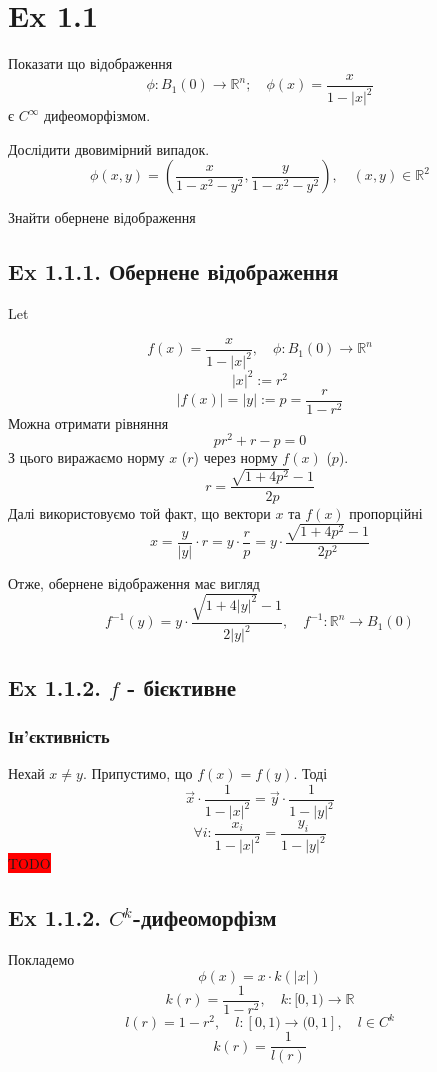 \documentclass[10pt, a4paper]{article} %
\newcommand{\R}{\mathbb{R}}
\newcommand{\todo}[1]{\colorbox{red}{#1}}
\begin{document}
\section*{Ex 1.1}
\begin{mdframed}
    Показати що відображення 
    \[\phi: B_1(0) \to \R^n; \quad \phi(x)=\frac{x}{1-|x|^2}\]
    є $C^\infty$ дифеоморфізмом.

    Дослідити двовимірний випадок.
    \[\phi(x,y) = \left(\frac{x}{1-x^2-y^2}, \frac{y}{1-x^2-y^2}\right), \quad (x,y)\in\R^2\]

    Знайти обернене відображення
\end{mdframed}

\subsection*{Ex 1.1.1. Обернене відображення}

Let 

\[f(x) = \frac{x}{1-|x|^2}, \quad \phi : B_{1}(0) \to \R^n\]
\[|x|^2 := r^2\]
\[|f(x)| = |y| := p = \frac{r}{1-r^2}\]
Можна отримати рівняння
\[pr^2+r-p=0\]
З цього виражаємо норму $x$ ($r$) через норму $f(x)$ ($p$).
\[r = \frac{\sqrt{1+4p^2}-1}{2p}\]
Далі використовуємо той факт, що вектори $x$ та $f(x)$ пропорційні
\[x = \frac{y}{|y|}\cdot r = y \cdot \frac{r}{p} = y \cdot \frac{\sqrt{1+4p^2}-1}{2p^2}\]

\begin{mdframed}[backgroundcolor=green!20]
    Отже, обернене відображення має вигляд
    \[f^{-1}(y) = y \cdot \frac{\sqrt{1+4|y|^2}-1}{2|y|^2}, \quad f^{-1} : \R^n \to B_1(0)\]
\end{mdframed}

\subsection*{Ex 1.1.2. $f$ - бієктивне}
\subsubsection*{Ін'єктивність}

Нехай $x\ne y$. Припустимо, що $f(x)=f(y)$.
Тоді
\[\vec x\cdot \frac{1}{1-|x|^2} = \vec y \cdot \frac{1}{1-|y|^2}\]
\[\forall i: \frac{x_i}{1-|x|^2} = \frac{y_i}{1-|y|^2}\]
\todo{TODO}


\subsection*{Ex 1.1.2. $C^k$-дифеоморфізм}
Покладемо
\[\phi(x) = x \cdot k(|x|)\]
\[k(r) = \frac{1}{1-r^2}, \quad k : [0,1) \to \R\] 
\[l(r) = 1-r^2, \quad l : [0,1) \to (0,1], \quad l\in C^k\]
\[k(r) = \frac{1}{l(r)}\]
\end{document}
